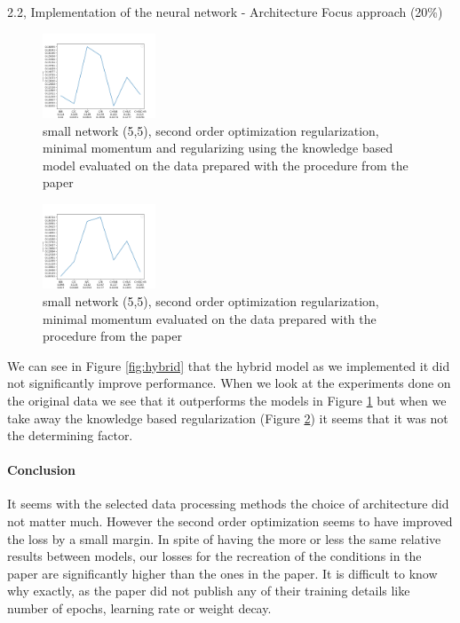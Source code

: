 \begin{task}{2.2, Implementation of the neural network - Architecture Focus approach (20\%)}
\begin{figure}
\begin{center}
\includegraphics[width=0.3\textwidth]{images/5-5.png}
\end{center}
\caption{small network (5,5), second order optimization regularization, minimal momentum and regularizing using the knowledge based model evaluated on the data prepared with the procedure from the paper}
\label{fig:hybridoriginal}
\end{figure}


\begin{figure}
\begin{center}
\includegraphics[width=0.3\textwidth]{images/5-5-0.09.png}
\end{center}
\caption{small network (5,5), second order optimization regularization, minimal momentum evaluated on the data prepared with the procedure from the paper}
\label{fig:secondorderoriginal}
\end{figure}

We can see in Figure \ref{fig:hybrid} that the hybrid model as we implemented it did not significantly improve performance. When we look at the experiments done on the original data we see that it outperforms the models in Figure \ref{fig:hybridoriginal} but when we take away the knowledge based regularization (Figure \ref{fig:secondorderoriginal}) it seems that it was not the determining factor.

\paragraph{Conclusion} It seems with the selected data processing methods the choice of architecture did not matter much. However the second order optimization seems to have improved the loss by a small margin. In spite of having the more or less the same relative results between models, our losses for the recreation of the conditions in the paper are significantly higher than the ones in the paper. It is difficult to know why exactly, as the paper did not publish any of their training details like number of epochs, learning rate or weight decay.

\end{task}